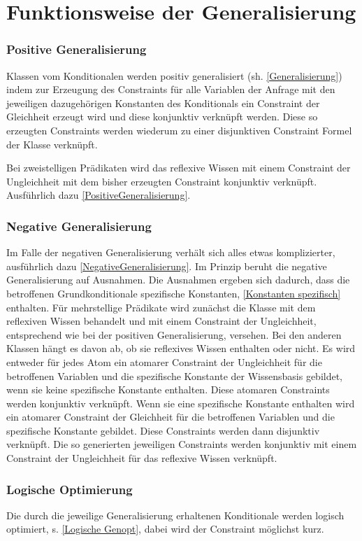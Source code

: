 \documentclass[a4paper, 11pt]{book}
\begin{document}
\label{general}
\section{Funktionsweise der Generalisierung} 
\subsubsection{Positive Generalisierung}  \label{Funktion positiv}
Klassen vom Konditionalen werden positiv generalisiert (sh. \ref{Generalisierung}) indem zur Erzeugung des Constraints für alle Variablen der Anfrage mit den jeweiligen dazugehörigen Konstanten des Konditionals ein Constraint der Gleichheit erzeugt wird und diese konjunktiv verknüpft werden. Diese so erzeugten Constraints werden wiederum zu einer disjunktiven Constraint Formel der Klasse verknüpft.{ Bei zweistelligen Prädikaten wird das reflexive Wissen mit einem Constraint der Ungleichheit mit dem bisher erzeugten Constraint konjunktiv verknüpft. Ausführlich dazu \ref{PositiveGeneralisierung}.
\subsubsection{Negative Generalisierung}  \label{Funktion negativ}
Im Falle der negativen Generalisierung verhält sich alles etwas komplizierter, ausführlich dazu \ref{NegativeGeneralisierung}. 
Im Prinzip beruht die negative Generalisierung auf Ausnahmen. Die Ausnahmen ergeben sich dadurch, dass die betroffenen Grundkonditionale spezifische Konstanten, \ref{Konstanten spezifisch} enthalten. Für mehrstellige Prädikate wird zunächst die Klasse mit dem reflexiven Wissen behandelt und mit einem Constraint der Ungleichheit, entsprechend wie bei der positiven Generalisierung, versehen. Bei den anderen Klassen hängt es davon ab, ob sie reflexives Wissen enthalten oder nicht. Es wird entweder für jedes Atom ein atomarer Constraint der Ungleichheit für die betroffenen Variablen und die spezifische Konstante der Wissensbasis gebildet, wenn sie keine spezifische Konstante enthalten. Diese atomaren Constraints werden konjunktiv verknüpft. Wenn sie eine spezifische Konstante enthalten wird ein atomarer Constraint der Gleichheit für die betroffenen Variablen und die spezifische Konstante gebildet. Diese Constraints werden dann disjunktiv verknüpft. Die so generierten jeweiligen Constraints werden konjunktiv mit einem Constraint der Ungleichheit für das reflexive Wissen verknüpft.
\subsubsection{Logische Optimierung}
Die durch die jeweilige Generalisierung erhaltenen Konditionale werden logisch optimiert, s. \ref{Logische Genopt}, dabei wird der Constraint möglichst kurz. 
}
\end{document}
